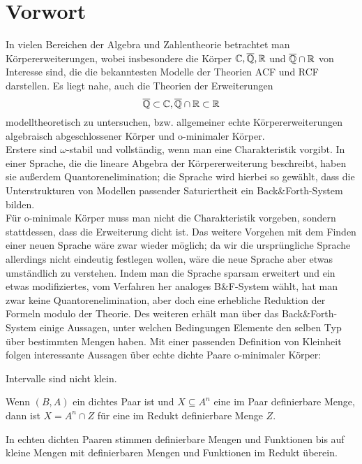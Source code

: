 \chapter*{Vorwort}
In vielen Bereichen der Algebra und Zahlentheorie betrachtet man Körpererweiterungen, wobei insbesondere die Körper $\mathbb{C},\overline{\mathbb{Q}},\mathbb{R}$ und $\overline{\mathbb{Q}}\cap\mathbb{R}$ von Interesse sind, die die bekanntesten Modelle der Theorien ACF und RCF darstellen. Es liegt nahe, auch die Theorien der Erweiterungen $$\overline{\mathbb{Q}}\subset\mathbb{C},\overline{\mathbb{Q}}\cap\mathbb{R}\subset\mathbb{R}$$ modelltheoretisch zu untersuchen, bzw. allgemeiner echte Körpererweiterungen algebraisch abgeschlossener Körper und o-minimaler Körper.\\
Erstere sind $\omega$-stabil und vollständig, wenn man eine Charakteristik vorgibt. In einer Sprache, die die lineare Abgebra der Körpererweiterung beschreibt, haben sie außerdem Quantorenelimination; die Sprache wird hierbei so gewählt, dass die Unterstrukturen von Modellen passender Saturiertheit ein Back\&Forth-System bilden.\\
Für o-minimale Körper muss man nicht die Charakteristik vorgeben, sondern stattdessen, dass die Erweiterung dicht ist. Das weitere Vorgehen mit dem Finden einer neuen Sprache wäre zwar wieder möglich; da wir die ursprüngliche Sprache allerdings nicht eindeutig festlegen wollen, wäre die neue Sprache aber etwas umständlich zu verstehen. Indem man die Sprache sparsam erweitert und ein etwas modifiziertes, vom Verfahren her analoges B\&F-System wählt, hat man zwar keine Quantorenelimination, aber doch eine erhebliche Reduktion der Formeln modulo der Theorie. Des weiteren erhält man über das Back\&Forth-System einige Aussagen, unter welchen Bedingungen Elemente den selben Typ über bestimmten Mengen haben. Mit einer passenden Definition von Kleinheit folgen interessante Aussagen über echte dichte Paare o-minimaler Körper:
\begin{satzleer}
	Intervalle sind nicht klein.
\end{satzleer}

\begin{satzleer}
	Wenn $(B,A)$ ein dichtes Paar ist und $X\subseteq A^n$ eine im Paar definierbare Menge, dann ist $X=A^n\cap Z$ für eine im Redukt definierbare Menge $Z$.
\end{satzleer}

\begin{satzleer}
	In echten dichten Paaren stimmen definierbare Mengen und Funktionen bis auf kleine Mengen mit definierbaren Mengen und Funktionen im Redukt überein.
\end{satzleer}

